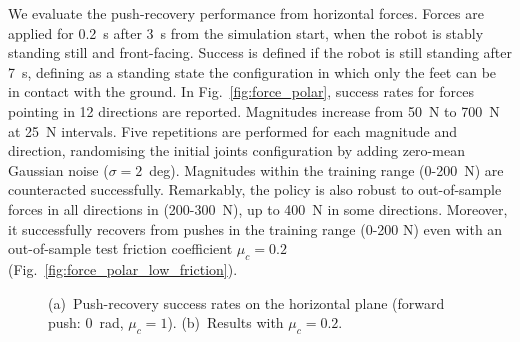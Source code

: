 We evaluate the push-recovery performance from horizontal forces.
Forces are applied for 0.2~s after 3~s from the simulation start, when the robot is stably standing still and front-facing.
Success is defined if the robot is still standing after 7~s, defining as a standing state the configuration in which only the feet can be in contact with the ground.
In Fig.~\ref{fig:force_polar}, success rates for forces pointing in 12 directions are reported.
Magnitudes increase from 50~N to 700~N at 25~N intervals.
Five repetitions are performed for each magnitude and direction, randomising the initial joints configuration by adding zero-mean Gaussian noise ($\sigma = 2$~deg).
Magnitudes within the training range (0-200~N) are counteracted successfully.
Remarkably, the policy is also robust to out-of-sample forces in all directions in (200-300~N), up to 400~N in some directions.
Moreover, it successfully recovers from pushes in the training range (0-200 N) even with an out-of-sample test friction coefficient $\mu_c=0.2$ (Fig.~\ref{fig:force_polar_low_friction}).

\begin{figure}
    \centering
    \hspace{-7mm}
    \caption{(a)~Push-recovery success rates on the horizontal plane (forward push: $0$~rad, $\mu_c=1$). (b)~Results with  $\mu_c=0.2$.}
\end{figure}

